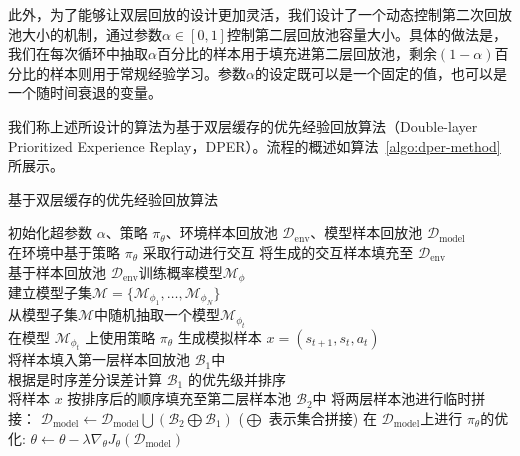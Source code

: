此外，为了能够让双层回放的设计更加灵活，我们设计了一个动态控制第二次回放池大小的机制，通过参数$\alpha\in[0,1]$控制第二层回放池容量大小。具体的做法是，我们在每次循环中抽取$\alpha$百分比的样本用于填充进第二层回放池，剩余$(1-\alpha)$百分比的样本则用于常规经验学习。参数$\alpha$的设定既可以是一个固定的值，也可以是一个随时间衰退的变量。

我们称上述所设计的算法为基于双层缓存的优先经验回放算法（Double-layer Prioritized Experience Replay，DPER）。流程的概述如算法~\ref{algo:dper-method}所展示。

\begin{algorithm}
\caption{基于双层缓存的优先经验回放算法}
\label{algo:dper-method}
\begin{algorithmic}
\STATE 初始化超参数 $\alpha$、策略 $\pi_\theta$、环境样本回放池 $\mathcal{D}_{\mathrm{env}}$、模型样本回放池 $\mathcal{D}_{\mathrm{model}}$\\
    \STATE 在环境中基于策略 $\pi_\theta$ 采取行动进行交互
    \STATE 将生成的交互样本填充至 $\mathcal{D}_{\mathrm{env}}$\\
        \STATE 基于样本回放池 $\mathcal{D}_{\mathrm{env}}$训练概率模型$\mathcal{M}_\phi$\\
        \STATE 建立模型子集$\mathcal{M} = \{\mathcal{M}_{\phi_1},\ldots,\mathcal{M}_{\phi_{N}}\}$\\
            \STATE 从模型子集$\mathcal{M}$中随机抽取一个模型$\mathcal{M}_{\phi_t}$\\
            \STATE 在模型 $\mathcal{M}_{\phi_t}$ 上使用策略 $\pi_\theta$ 生成模拟样本 $x=\left(s_{t+1},s_t,a_t\right)$ \\
            \STATE 将样本填入第一层样本回放池 $\mathcal{B}_1$中\\
        \ENDFOR
        \STATE 根据是时序差分误差计算 $\mathcal{B}_1$ 的优先级并排序\\
                \STATE 将样本 $x$ 按排序后的顺序填充至第二层样本池 $\mathcal{B}_{2}$中
            \ENDIF
        \ENDFOR
        \STATE 将两层样本池进行临时拼接： $\mathcal{D}_{\mathrm{model}}\leftarrow\mathcal{D}_{\mathrm{model}}\bigcup(\mathcal{B}_2\bigoplus\mathcal{B}_1)$ ($\bigoplus$ 表示集合拼接)
    \ENDFOR
    \STATE 在 $\mathcal{D}_{\mathrm{model}}$上进行 $\pi_\theta$的优化: $\theta\leftarrow \theta - \lambda\nabla_\theta J_\theta(\mathcal{D}_{\mathrm{model}})$
\ENDFOR
\end{algorithmic}
\end{algorithm}

